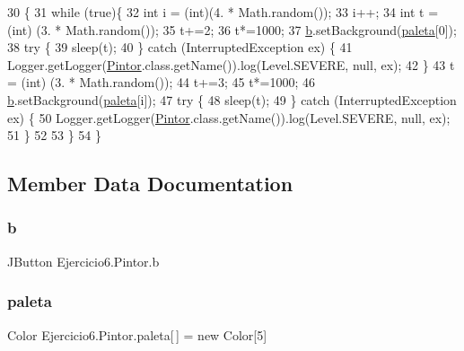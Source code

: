 \begin{DoxyCode}
30                      \{
31           \textcolor{keywordflow}{while} (\textcolor{keyword}{true})\{
32             \textcolor{keywordtype}{int} i = (int)(4. * Math.random());
33             i++;
34             \textcolor{keywordtype}{int} t = (int) (3. * Math.random());
35             t+=2;
36             t*=1000;
37             \mbox{\hyperlink{class_ejercicio6_1_1_pintor_aec7eeb4a5b66d768545833f994d68960}{b}}.setBackground(\mbox{\hyperlink{class_ejercicio6_1_1_pintor_aba0f36a5798f20695b1fa58540c2129e}{paleta}}[0]);
38               \textcolor{keywordflow}{try} \{
39                   sleep(t);
40               \} \textcolor{keywordflow}{catch} (InterruptedException ex) \{
41                   Logger.getLogger(\mbox{\hyperlink{class_ejercicio6_1_1_pintor_a5d5a367fdb3202719bebd5583463f3d0}{Pintor}}.class.getName()).log(Level.SEVERE, null, ex);
42               \}
43             t = (int) (3. * Math.random());
44             t+=3;
45             t*=1000;
46             \mbox{\hyperlink{class_ejercicio6_1_1_pintor_aec7eeb4a5b66d768545833f994d68960}{b}}.setBackground(\mbox{\hyperlink{class_ejercicio6_1_1_pintor_aba0f36a5798f20695b1fa58540c2129e}{paleta}}[i]);
47               \textcolor{keywordflow}{try} \{
48                   sleep(t);
49               \} \textcolor{keywordflow}{catch} (InterruptedException ex) \{
50                   Logger.getLogger(\mbox{\hyperlink{class_ejercicio6_1_1_pintor_a5d5a367fdb3202719bebd5583463f3d0}{Pintor}}.class.getName()).log(Level.SEVERE, null, ex);
51               \}
52               
53         \}
54     \}
\end{DoxyCode}


\subsection{Member Data Documentation}
\mbox{\label{class_ejercicio6_1_1_pintor_aec7eeb4a5b66d768545833f994d68960}} 
\subsubsection{\texorpdfstring{b}{b}}
{\footnotesize\ttfamily J\+Button Ejercicio6.\+Pintor.\+b\hspace{0.3cm}{\ttfamily [package]}}

\mbox{\label{class_ejercicio6_1_1_pintor_aba0f36a5798f20695b1fa58540c2129e}} 
\subsubsection{\texorpdfstring{paleta}{paleta}}
{\footnotesize\ttfamily Color Ejercicio6.\+Pintor.\+paleta\mbox{[}$\,$\mbox{]} = new Color\mbox{[}5\mbox{]}\hspace{0.3cm}{\ttfamily [package]}}

